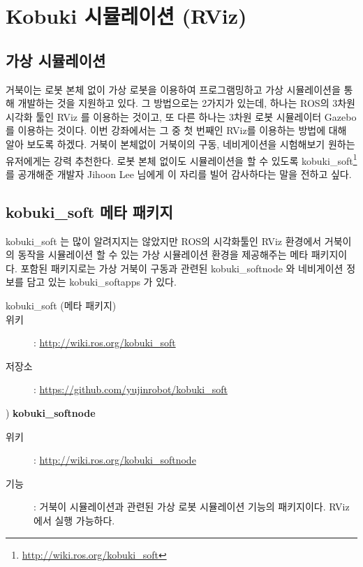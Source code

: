 \section{Kobuki 시뮬레이션 (RViz)}

\subsection{가상 시뮬레이션}

거북이는 로봇 본체 없이 가상 로봇을 이용하여 프로그램밍하고 가상 시뮬레이션을 통해 개발하는 것을 지원하고 있다. 그 방법으로는 2가지가 있는데, 하나는 ROS의 3차원 시각화 툴인 RViz 를 이용하는 것이고, 또 다른 하나는 3차원 로봇 시뮬레이터 Gazebo를 이용하는 것이다. 이번 강좌에서는 그 중 첫 번째인 RViz를 이용하는 방법에 대해 알아 보도록 하겠다. 거북이 본체없이 거북이의 구동, 네비게이션을 시험해보기 원하는 유저에게는 강력 추천한다. 로봇 본체 없이도 시뮬레이션을 할 수 있도록 kobuki\_soft\footnote{\url{http://wiki.ros.org/kobuki_soft}} 를 공개해준 개발자 Jihoon Lee 님에게 이 자리를 빌어 감사하다는 말을 전하고 싶다.

\subsection{kobuki\_soft 메타 패키지}

kobuki\_soft 는 많이 알려지지는 않았지만 ROS의 시각화툴인 RViz 환경에서 거북이의 동작을 시뮬레이션 할 수 있는 가상 시뮬레이션 환경을 제공해주는 메타 패키지이다. 포함된 패키지로는 가상 거북이 구동과 관련된 kobuki\_softnode 와 네비게이션 정보를 담고 있는 kobuki\_softapps 가 있다. 

\vspace{\baselineskip}
\begin{description}
\item[kobuki\_soft (메타 패키지)]
\item[위키]: \url{http://wiki.ros.org/kobuki_soft}
\item[저장소]: \url{https://github.com/yujinrobot/kobuki_soft}
\end{description}

\setcounter{num}{0}

\vspace{\baselineskip}
\noindent{}
\thenum) \textbf{kobuki\_softnode}
\begin{description}
\item[위키]: \url{http://wiki.ros.org/kobuki_softnode}
\item[기능]: 거북이 시뮬레이션과 관련된 가상 로봇 시뮬레이션 기능의 패키지이다. RViz 에서 실행 가능하다.
\end{description}

